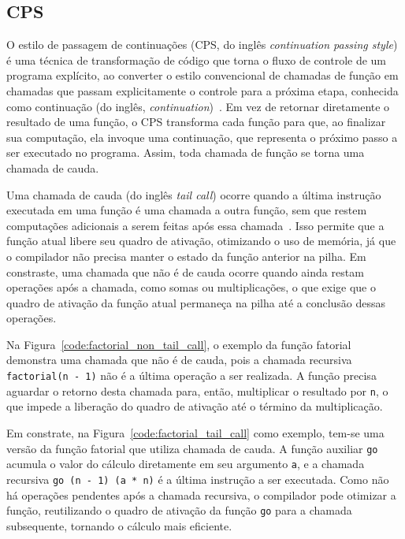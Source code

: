 \subsection{CPS}\label{subsec:cps}

O estilo de passagem de continuações (CPS, do inglês \textit{continuation passing style}) é uma técnica de transformação de código que torna o fluxo de controle de um programa explícito, ao converter o estilo convencional de chamadas de função em chamadas que passam explicitamente o controle para a próxima etapa, conhecida como continuação (do inglês, \textit{continuation})~\cite{appel1992compiling}.
Em vez de retornar diretamente o resultado de uma função, o CPS transforma cada função para que, ao finalizar sua computação, ela invoque uma continuação, que representa o próximo passo a ser executado no programa.
Assim, toda chamada de função se torna uma chamada de cauda.

Uma chamada de cauda (do inglês \textit{tail call}) ocorre quando a última instrução executada em uma função é uma chamada a outra função, sem que restem computações adicionais a serem feitas após essa chamada~\cite{muchnick1997advanced}.
Isso permite que a função atual libere seu quadro de ativação, otimizando o uso de memória, já que o compilador não precisa manter o estado da função anterior na pilha.
Em constraste, uma chamada que não é de cauda ocorre quando ainda restam operações após a chamada, como somas ou multiplicações, o que exige que o quadro de ativação da função atual permaneça na pilha até a conclusão dessas operações.

Na Figura~\ref{code:factorial_non_tail_call}, o exemplo da função fatorial demonstra uma chamada que não é de cauda, pois a chamada recursiva \texttt{factorial(n - 1)} não é a última operação a ser realizada.
A função precisa aguardar o retorno desta chamada para, então, multiplicar o resultado por \texttt{n}, o que impede a liberação do quadro de ativação até o término da multiplicação.

Em constrate, na Figura~\ref{code:factorial_tail_call} como exemplo, tem-se uma versão da função fatorial que utiliza chamada de cauda.
A função auxiliar \texttt{go} acumula o valor do cálculo diretamente em seu argumento \texttt{a}, e a chamada recursiva \texttt{go (n - 1) (a * n)} é a última instrução a ser executada.
Como não há operações pendentes após a chamada recursiva, o compilador pode otimizar a função, reutilizando o quadro de ativação da função \texttt{go} para a chamada subsequente, tornando o cálculo mais eficiente.

